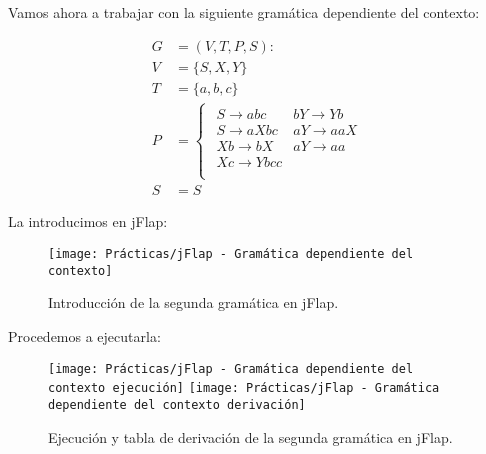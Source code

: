 Vamos ahora a trabajar con la siguiente gramática dependiente del contexto:

\begin{align*}
	G &= (V, T, P, S) : \\
	V &= \{S, X, Y\} \\
	T &= \{a, b, c\} \\
	P &=
		\begin{cases}
		\begin{array}{ll}
			S \rightarrow abc   & bY \rightarrow Yb  \\
			S \rightarrow aXbc  & aY \rightarrow aaX \\
			Xb \rightarrow bX   & aY\rightarrow aa   \\
			Xc \rightarrow Ybcc &                    \\
		\end{array}
 		\end{cases} \\
	S &= S
\end{align*}

\pagebreak

La introducimos en jFlap:

\begin{figure}[h!]
\begin{center}
	\texttt{[image: Prácticas/jFlap - Gramática dependiente del contexto]}
\end{center}
\caption{Introducción de la segunda gramática en jFlap.}
\end{figure}

Procedemos a ejecutarla:

\begin{figure}[h!]
\begin{center}
	\texttt{[image: Prácticas/jFlap - Gramática dependiente del contexto ejecución]}
	\texttt{[image: Prácticas/jFlap - Gramática dependiente del contexto derivación]}
\end{center}
\caption{Ejecución y tabla de derivación de la segunda gramática en jFlap.}
\end{figure}
